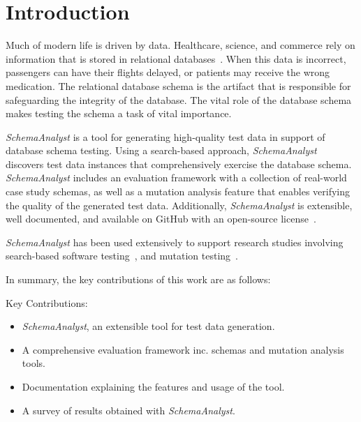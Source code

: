 \section{Introduction}

Much of modern life is driven by data.  Healthcare, science, and commerce rely on information that is
stored in relational databases~\cite{kapfhammer2007comprehensive}.  When this data is incorrect, passengers can have their flights
delayed, or patients may receive the wrong medication. The relational database schema is the artifact
that is responsible for safeguarding the integrity of the database. The vital role of the database
schema makes testing the schema a task of vital importance.

\textit{SchemaAnalyst} is a tool for generating high-quality test data in support of database schema
testing. Using a search-based approach, \textit{SchemaAnalyst} discovers test data instances that
comprehensively exercise the database schema. \textit{SchemaAnalyst} includes an evaluation framework
with a collection of real-world case study schemas, as well as a mutation analysis feature
that enables verifying the quality of the generated test data. Additionally, \textit{SchemaAnalyst}
is extensible, well documented, and available on GitHub with an open-source license~\cite{tool}.

\textit{SchemaAnalyst} has been used extensively to support research studies involving search-based
software testing~\cite{kapfhammer2013search,mcminn2015effectiveness,kinneer2015automatically}, and
mutation testing~\cite{wright2013efficient,wright2014impact,wright2015mutation}.

In summary, the key contributions of this work are as follows:

Key Contributions:
\begin{itemize}
\item \textit{SchemaAnalyst}, an extensible tool for test data generation.
\item A comprehensive evaluation framework inc. schemas and mutation analysis tools.
\item Documentation explaining the features and usage of the tool.
\item A survey of results obtained with \textit{SchemaAnalyst}.
\end{itemize}
